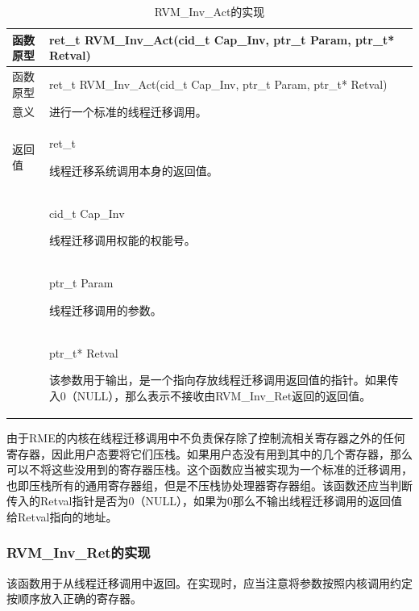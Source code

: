 \begin{xltabular}{\textwidth}{@{}>{\hsize\raggedright\arraybackslash}X>{\hsize\raggedright\arraybackslash}X@{}}
\caption{RVM\_\allowbreak{}Inv\_\allowbreak{}Act的实现}\label{tab:8-10}\\
\toprule
函数原型 & ret\_\allowbreak{}t RVM\_\allowbreak{}Inv\_\allowbreak{}Act(cid\_\allowbreak{}t Cap\_\allowbreak{}Inv, ptr\_\allowbreak{}t Param, ptr\_\allowbreak{}t*
Retval)\tabularnewline
\endfirsthead
\toprule
函数原型 & ret\_\allowbreak{}t RVM\_\allowbreak{}Inv\_\allowbreak{}Act(cid\_\allowbreak{}t Cap\_\allowbreak{}Inv, ptr\_\allowbreak{}t Param, ptr\_\allowbreak{}t*
Retval)\tabularnewline
\midrule
\endhead
\bottomrule
\endlastfoot
意义 & 进行一个标准的线程迁移调用。\tabularnewline
返回值\strut
 & ret\_\allowbreak{}t

线程迁移系统调用本身的返回值。\strut
\tabularnewline
{} & cid\_\allowbreak{}t Cap\_\allowbreak{}Inv

线程迁移调用权能的权能号。\strut
\tabularnewline
\strut
 & ptr\_\allowbreak{}t Param

线程迁移调用的参数。\strut
\tabularnewline
\strut
 & ptr\_\allowbreak{}t* Retval

该参数用于输出，是一个指向存放线程迁移调用返回值的指针。如果传入0（NULL），那么表示不接收由RVM\_Inv\_Ret返回的返回值。\strut
\tabularnewline
\end{xltabular}

由于RME的内核在线程迁移调用中不负责保存除了控制流相关寄存器之外的任何寄存器，因此用户态要将它们压栈。如果用户态没有用到其中的几个寄存器，那么可以不将这些没用到的寄存器压栈。这个函数应当被实现为一个标准的迁移调用，也即压栈所有的通用寄存器组，但是不压栈协处理器寄存器组。该函数还应当判断传入的Retval指针是否为0（NULL），如果为0那么不输出线程迁移调用的返回值给Retval指向的地址。

\subsubsection{RVM\_Inv\_Ret的实现}\label{subsubsec:8-2-6-5}

该函数用于从线程迁移调用中返回。在实现时，应当注意将参数按照内核调用约定按顺序放入正确的寄存器。

